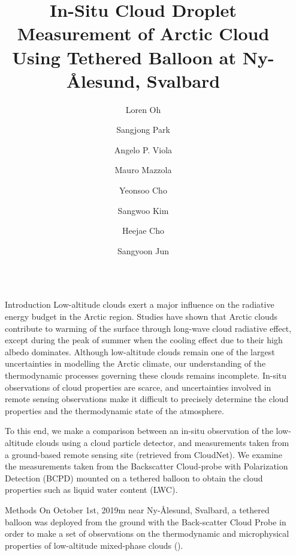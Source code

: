 \documentclass[final]{beamer}
\title{In-Situ Cloud Droplet Measurement of Arctic Cloud \\ Using Tethered Balloon at Ny-\r{A}lesund, Svalbard}
\author{
  Loren Oh \inst{1} \and
  Sangjong Park \inst{1} \and
  Angelo P. Viola \inst{2} \and
  Mauro Mazzola \inst{2} \and
  Yeonsoo Cho \inst{3} \and
  Sangwoo Kim \inst{3} \and
  Heejae Cho \inst{1} \and
  Sangyoon Jun \inst{1}
}
\institute[shortinst]{
  \inst{1} Korea Polar Research Institute (KOPRI) \samelineand 
  \inst{2} CNR Institute of Polar Sciences \samelineand
  \inst{3} Seoul National University
}
\newlength{\sepwidth}
\newlength{\colwidth}
\newcommand{\separatorcolumn}{\begin{column}{\sepwidth}\end{column}}
\begin{document}
\begin{frame}[t]
  \begin{columns}[t]
    \separatorcolumn

    \begin{column}{\colwidth}

      \begin{block}{Introduction}
        Low-altitude clouds exert a major influence on the radiative energy budget in the Arctic region. Studies have shown that Arctic clouds contribute to warming of the surface through long-wave cloud radiative effect, except during the peak of summer when the cooling effect due to their high albedo dominates. Although low-altitude clouds remain one of the largest uncertainties in modelling the Arctic climate, our understanding of the thermodynamic processes governing these clouds remains incomplete. In-situ observations of cloud properties are scarce, and uncertainties involved in remote sensing observations make it difficult to precisely determine the cloud properties and the thermodynamic state of the atmosphere.

        To this end, we make a comparison between an in-situ observation of the low-altitude clouds using a cloud particle detector, and measurements taken from a ground-based remote sensing site (retrieved from CloudNet). We examine the measurements taken from the Backscatter Cloud-probe with Polarization Detection (BCPD) mounted on a tethered balloon to obtain the cloud properties such as liquid water content (LWC).
      \end{block}

      \begin{block}{Methods}
        On October 1st, 2019m near Ny-\r{A}lesund, Svalbard, a tethered balloon was deployed from the ground with the Back-scatter Cloud Probe \cite{baumgardner2014ice, thomson2014compact} in order to make a set of observations on the thermodynamic and microphysical properties of low-altitude mixed-phase clouds ().


\end{block}
\end{column}
\end{columns}
\end{frame}
\end{document}
